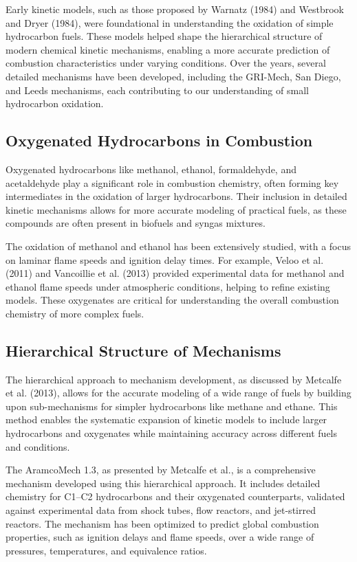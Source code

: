 \documentclass[12pt]{report}
\begin{document}
Early kinetic models, such as those proposed by Warnatz (1984) and Westbrook and Dryer (1984), were foundational in understanding the oxidation of simple hydrocarbon fuels. These models helped shape the hierarchical structure of modern chemical kinetic mechanisms, enabling a more accurate prediction of combustion characteristics under varying conditions. Over the years, several detailed mechanisms have been developed, including the GRI-Mech, San Diego, and Leeds mechanisms, each contributing to our understanding of small hydrocarbon oxidation.

\subsection{Oxygenated Hydrocarbons in Combustion}
Oxygenated hydrocarbons like methanol, ethanol, formaldehyde, and acetaldehyde play a significant role in combustion chemistry, often forming key intermediates in the oxidation of larger hydrocarbons. Their inclusion in detailed kinetic mechanisms allows for more accurate modeling of practical fuels, as these compounds are often present in biofuels and syngas mixtures.

The oxidation of methanol and ethanol has been extensively studied, with a focus on laminar flame speeds and ignition delay times. For example, Veloo et al. (2011) and Vancoillie et al. (2013) provided experimental data for methanol and ethanol flame speeds under atmospheric conditions, helping to refine existing models. These oxygenates are critical for understanding the overall combustion chemistry of more complex fuels.

\subsection{Hierarchical Structure of Mechanisms}
The hierarchical approach to mechanism development, as discussed by Metcalfe et al. (2013), allows for the accurate modeling of a wide range of fuels by building upon sub-mechanisms for simpler hydrocarbons like methane and ethane. This method enables the systematic expansion of kinetic models to include larger hydrocarbons and oxygenates while maintaining accuracy across different fuels and conditions.

The AramcoMech 1.3, as presented by Metcalfe et al., is a comprehensive mechanism developed using this hierarchical approach. It includes detailed chemistry for C1–C2 hydrocarbons and their oxygenated counterparts, validated against experimental data from shock tubes, flow reactors, and jet-stirred reactors. The mechanism has been optimized to predict global combustion properties, such as ignition delays and flame speeds, over a wide range of pressures, temperatures, and equivalence ratios.
\end{document}
